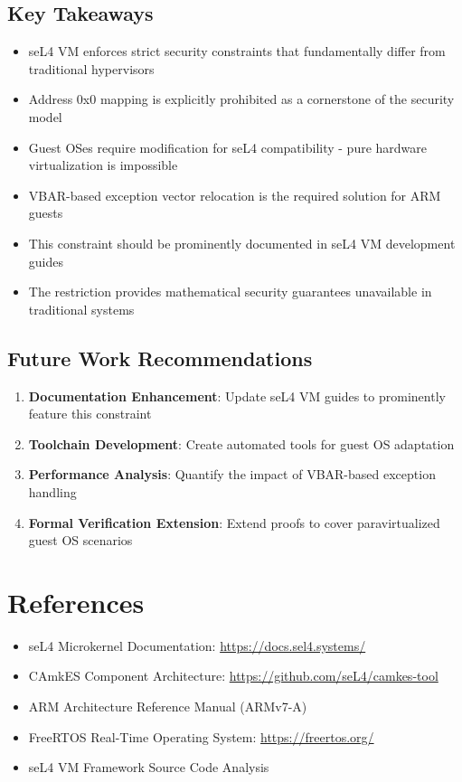 \documentclass[11pt,a4paper]{article}
\begin{document}
\subsection{Key Takeaways}

\begin{itemize}
    \item seL4 VM enforces strict security constraints that fundamentally differ from traditional hypervisors
    \item Address 0x0 mapping is explicitly prohibited as a cornerstone of the security model
    \item Guest OSes require modification for seL4 compatibility - pure hardware virtualization is impossible
    \item VBAR-based exception vector relocation is the required solution for ARM guests
    \item This constraint should be prominently documented in seL4 VM development guides
    \item The restriction provides mathematical security guarantees unavailable in traditional systems
\end{itemize}

\subsection{Future Work Recommendations}

\begin{enumerate}
    \item \textbf{Documentation Enhancement}: Update seL4 VM guides to prominently feature this constraint
    \item \textbf{Toolchain Development}: Create automated tools for guest OS adaptation
    \item \textbf{Performance Analysis}: Quantify the impact of VBAR-based exception handling
    \item \textbf{Formal Verification Extension}: Extend proofs to cover paravirtualized guest OS scenarios
\end{enumerate}

\section{References}

\begin{itemize}
    \item seL4 Microkernel Documentation: \url{https://docs.sel4.systems/}
    \item CAmkES Component Architecture: \url{https://github.com/seL4/camkes-tool}
    \item ARM Architecture Reference Manual (ARMv7-A)
    \item FreeRTOS Real-Time Operating System: \url{https://freertos.org/}
    \item seL4 VM Framework Source Code Analysis
\end{itemize}
\end{document}
